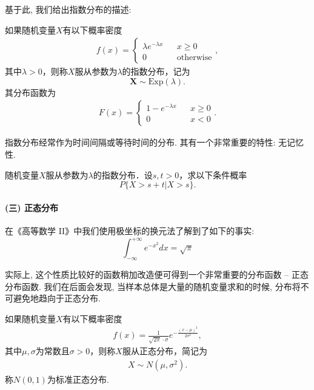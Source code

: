 基于此, 我们给出指数分布的描述: 
\begin{definition}
    如果随机变量$X$有以下概率密度
    \begin{align*}
    f(x)=\left\{\begin{array}{lcl}
    \lambda e^{-\lambda x} & & x\ge 0 \\
    0 & & \mbox{otherwise}
    \end{array}\right. ,
    \end{align*}
    其中$\lambda>0$，则称$X$服从参数为$\lambda$的指数分布，记为
    \[\pmb X\sim \text{Exp}(\lambda). \]
    其分布函数为
    \begin{align*}
    F(x)=\left\{\begin{array}{lcl}
    1- e^{-\lambda x} & & x\ge 0 \\
    0 & & x<0
    \end{array}\right. .
    \end{align*}
    \end{definition}

    指数分布经常作为时间间隔或等待时间的分布. 其有一个非常重要的特性: 无记忆性. 

    \begin{proposition}[指数分布的无记忆性]
        随机变量$X$服从参数为$\lambda$的指数分布．设$s,t>0$，求以下条件概率
\[ P\{X>s+t|X>s\}.\]
    \end{proposition}

    \paragraph{(三) 正态分布}

    在《高等数学 II》中我们使用极坐标的换元法了解到了如下的事实: 
    $$
    \int_{-\infty}^{+\infty}e^{-x^2} dx =\sqrt \pi 
    $$

    实际上, 这个性质比较好的函数稍加改造便可得到一个非常重要的分布函数 --
    正态分布函数. 我们在后面会发现, 当样本总体是大量的随机变量求和的时候, 
    分布将不可避免地趋向于正态分布. 

    \begin{definition}
        如果随机变量$X$有以下概率密度
        \begin{align*}
        f(x)=\frac1{\sqrt{2\pi}\cdot\sigma}e^{-\frac{(x-\mu)^2}{2\sigma^2}},
        \end{align*}
        其中$\mu,\sigma$为常数且$\sigma>0$，则称$X$服从正态分布，简记为%
        \begin{align*}
        X \sim N(\mu,\sigma^2).
        \end{align*}
        称$N(0,1)$为标准正态分布.
        \end{definition}

    


